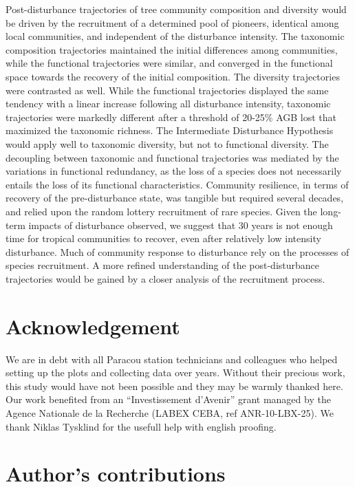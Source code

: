 \documentclass[fleqn,10pt]{ArtEcoFoG} %
\begin{document}
Post-disturbance trajectories of tree community composition and diversity would be driven by the recruitment of a determined pool of pioneers, identical among local communities, and independent of the disturbance intensity.
The taxonomic composition trajectories maintained the initial differences among communities, while the functional trajectories were similar, and converged in the functional space towards the recovery of the initial composition.
The diversity trajectories were contrasted as well.
While the functional trajectories \color{red} displayed the same tendency with a linear increase following all disturbance intensity, \color{black} taxonomic trajectories were markedly different after a threshold of 20-25\% AGB lost that maximized the taxonomic richness.
The Intermediate Disturbance Hypothesis would apply well to taxonomic diversity, but not to functional diversity.
The decoupling between taxonomic and functional trajectories was mediated by the variations in functional redundancy, as the loss of a species does not necessarily entails the loss of its functional characteristics.
Community resilience, in terms of recovery of the pre-disturbance state, was tangible but required several decades, and relied upon the random lottery recruitment of rare species.
Given the long-term impacts of disturbance observed, we suggest that 30 years is not enough time for tropical communities to recover, even after relatively low intensity disturbance.
Much of community response to disturbance rely on the processes of species recruitment.
A more refined understanding of the post-disturbance trajectories would be gained by a closer analysis of the recruitment process.

\hypertarget{acknowledgement}{%
\section{Acknowledgement}\label{acknowledgement}}

We are in debt with all Paracou station technicians and colleagues who helped setting up the plots and collecting data over years.
Without their precious work, this study would have not been possible and they may be warmly thanked here.
Our work benefited from an ``Investissement d'Avenir'' grant managed by the Agence
Nationale de la Recherche (LABEX CEBA, ref ANR-10-LBX-25).
We thank Niklas Tysklind for the usefull help with english proofing.

\hypertarget{authors-contributions}{%
\section{Author's contributions}\label{authors-contributions}}
\end{document}
